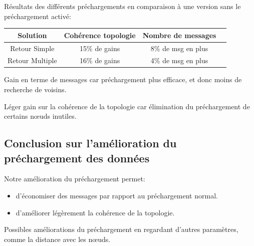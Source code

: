 \documentclass{beamer}
\begin{document}
  \begin{frame}
	 Résultats des différents préchargements en comparaison à une version sans le préchargement activé:
	\vspace{7mm}
        \begin{table}[!h]
                \begin{center}
                \begin{tabular}{|c|c|c|c|}
                \hline
                Solution & Cohérence topologie & Nombre de messages \\
                \hline
                Retour Simple & 15\% de gains &  8\% de msg en plus\\
                Retour Multiple & 16\% de gains &  4\% de msg en plus\\
                \hline
                \end{tabular}
                \end{center}
                \label{tab:config1}
        \end{table}
	\begin{itemize}\footnotesize{
		\item Gain en terme de messages car préchargement plus efficace, et donc moins de recherche de voisins.
		\item Léger gain sur la cohérence de la topologie car élimination du préchargement de certains nœuds inutiles.
		}
	\end{itemize}
  \end{frame}

  \subsection{Conclusion sur l'amélioration du préchargement des données}
  \begin{frame}
	Notre amélioration du préchargement permet:
	\begin{itemize}
		\item d'économiser des messages par rapport au préchargement normal.\\
		\item d'améliorer légèrement la cohérence de la topologie.\\
	\end{itemize}
	\vspace{5mm}
	Possibles améliorations du préchargement en regardant d'autres paramètres, comme la distance avec les nœuds.
  \end{frame}
	
  
\end{document}

